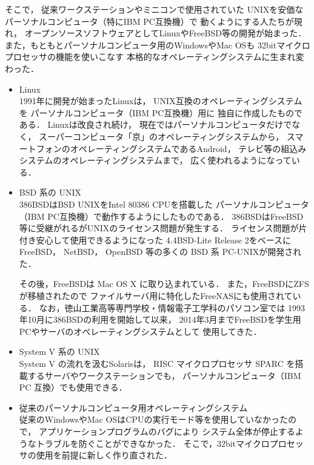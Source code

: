 \begin{enumerate}
    そこで，
    従来ワークステーションやミニコンで使用されていた
    UNIXを安価なパーソナルコンピュータ（特にIBM PC互換機）で
    動くようにする人たちが現れ，
    オープンソースソフトウェアとしてLinuxやFreeBSD等の開発が始まった．
    また，もともとパーソナルコンピュータ用のWindowsやMac OSも
    32bitマイクロプロセッサの機能を使いこなす
    本格的なオペレーティングシステムに生まれ変わった．

    \begin{itemize}
    \item Linux \\
      1991年に開発が始まったLinuxは，
      UNIX互換のオペレーティングシステムを
      パーソナルコンピュータ（IBM PC互換機）用に
      独自に作成したものである\cite{linux}．
      Linuxは改良され続け，
      現在ではパーソナルコンピュータだけでなく，
      スーパーコンピュータ「京」のオペレーティングシステム\cite{kei}から，
      スマートフォンのオペレーティングシステムであるAndroid\cite{android}，
      テレビ等の組込みシステムのオペレーティングシステムまで，
      広く使われるようになっている．

    \item BSD 系の UNIX \\
      386BSD\cite{386bsd}はBSD UNIXをIntel 80386 CPUを搭載した
      パーソナルコンピュータ（IBM PC互換機）で動作するようにしたものである．
      386BSDはFreeBSD等に受継がれるがUNIXのライセンス問題が発生する\cite{unix}．
      ライセンス問題が片付き安心して使用できるようになった
      4.4BSD-Lite Release 2\cite{unix}をベースに
      FreeBSD， NetBSD， OpenBSD 等の多くの BSD 系 PC-UNIXが開発された．

      その後，FreeBSDは Mac OS X に取り込まれている．
      また，FreeBSDにZFSが移植された\cite{zfs}ので
      ファイルサーバ用に特化したFreeNAS\cite{freenas}にも使用されている．
      なお，徳山工業高等専門学校・情報電子工学科のパソコン室では
      1993年10月に386BSDの利用を開始して以来，
      2014年3月までFreeBSDを学生用PCやサーバのオペレーティングシステムとして
      使用してきた\cite{iebsd}．

    \item System V 系の UNIX \\
      System V の流れを汲むSolaris\cite{solaris}は，
      RISC マイクロプロセッサ SPARC を搭載するサーバやワークステーションでも，
      パーソナルコンピュータ（IBM PC 互換）でも使用できる．

    \item 従来のパーソナルコンピュータ用オペレーティングシステム \\
      従来のWindowsやMac OSはCPUの実行モード等を使用していなかったので，
      アプリケーションプログラムのバグにより
      システム全体が停止するようなトラブルを防ぐことができなかった．
      そこで，32bitマイクロプロセッサの使用を前提に新しく作り直された．


\end{itemize}
\end{enumerate}
